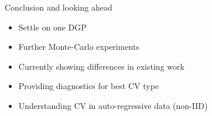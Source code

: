 \documentclass{beamer}
\begin{document}
\begin{frame}{Conclusion and looking ahead}
\begin{itemize}
\item Settle on one DGP
\item Further Monte-Carlo experiments
\item Currently showing differences in existing work
\item Providing diagnostics for best CV type
\item Understanding CV in auto-regressive data (non-IID)
\end{itemize}
\end{frame}
\end{document}
